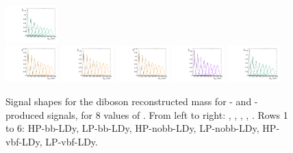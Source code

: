 \begin{figure}[htbp]
  \includegraphics[width=0.18\textwidth]{fig/2Dfit/templateSignalVsMX_fromDC_WprToWH_MVV_mu_HP_vbf_LDy.pdf}\\
  \includegraphics[width=0.18\textwidth]{fig/2Dfit/templateSignalVsMX_fromDC_GbuToWW_MVV_mu_LP_vbf_LDy.pdf}
  \includegraphics[width=0.18\textwidth]{fig/2Dfit/templateSignalVsMX_fromDC_RadToWW_MVV_mu_LP_vbf_LDy.pdf}
  \includegraphics[width=0.18\textwidth]{fig/2Dfit/templateSignalVsMX_fromDC_ZprToWW_MVV_mu_LP_vbf_LDy.pdf}
  \includegraphics[width=0.18\textwidth]{fig/2Dfit/templateSignalVsMX_fromDC_WprToWZ_MVV_mu_LP_vbf_LDy.pdf}
  \includegraphics[width=0.18\textwidth]{fig/2Dfit/templateSignalVsMX_fromDC_WprToWH_MVV_mu_LP_vbf_LDy.pdf}\\
  \caption{
    Signal shapes for the diboson reconstructed mass \MVV for \ggF- and \DY-produced signals, for 8 values of \MX.
    From left to right: \GBulktoWW, \RadtoWW, \ZprtoWW, \WprtoWZ, \WprtoWH.
    Rows 1 to 6: HP-bb-LDy, LP-bb-LDy, HP-nobb-LDy, LP-nobb-LDy, HP-vbf-LDy, LP-vbf-LDy.
  }
  \label{fig:MVVShapes_NonVBF_LDy_Run2}
\end{figure}

